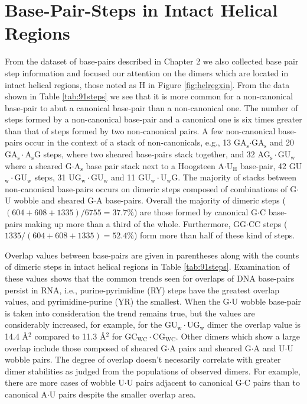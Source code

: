 \section{Base-Pair-Steps in Intact Helical Regions} 
From  the  dataset  of  base-pairs  described in  Chapter  2  we  also
collected base pair step information  and focused our attention on the
dimers which are  located in intact helical regions,  those noted as H
in  Figure   \ref{fig:helregxin}.   From  the  data   shown  in  Table
\ref{tab:91steps} we  see that it  is more common for  a non-canonical
base-pair to abut a canonical base-pair than a non-canonical one.  The
number of  steps formed by  a non-canonical base-pair and  a canonical
one  is  six   times  greater  than  that  of   steps  formed  by  two
non-canonical  pairs.  A few  non-canonical  base-pairs  occur in  the
context     of    a    stack     of    non-canonicals,     e.g.,    13
GA$_{\text{s}}$$\cdot$GA$_{\text{s}}$              and              20
GA$_{\text{s}}\cdot$A$_{\text{s}}$G    steps,   where    two   sheared
base-pairs stack  together, and 32 AG$_{\text{s}}\cdot$GU$_{\text{w}}$
where  a sheared  G$\cdot$A$_{\text{s}}$  base pair  stack  next to  a
Hoogsteen         A$\cdot$U$_{\text{H}}$         base-pair,         42
GU$_{\text{w}}\cdot$GU$_{\text{w}}$              steps,             31
UG$_{\text{w}}\cdot$GU$_{\text{w}}$               and               11
GU$_{\text{w}}\cdot$U$_{\text{w}}$G.   The majority of  stacks between
non-canonical   base-pairs  occurs  on   dimeric  steps   composed  of
combinations  of G$\cdot$U  wobble and  sheared  G$\cdot$A base-pairs.
Overall the majority of dimeric steps ($(604+608+1335)/6755 = 37.7\%$)
are those formed by canonical G$\cdot$C base-pairs making up more than
a    third   of   the    whole.    Furthermore,    GG$\cdot$CC   steps
($1335/(604+608+1335) = 52.4\%$) form more  than half of these kind of
steps.

Overlap values between base-pairs  are given in parentheses along with
the  counts  of dimeric  steps  in  intact  helical regions  in  Table
\ref{tab:91steps}. Examination  of these values shows  that the common
trends  seen for  overlaps of  DNA  base-pairs persist  in RNA,  i.e.,
purine-pyrimidine  (RY) steps  have the  greatest overlap  values, and
pyrimidine-purine  (YR)  the  smallest.   When  the  G$\cdot$U  wobble
base-pair is taken into consideration  the trend remains true, but the
values   are   considerably    increased,   for   example,   for   the
GU$_{\text{w}}\cdot$UG$_{\text{w}}$  dimer the  overlap value  is 14.4
\AA$^{\text{2}}$    compared     to    11.3    \AA$^{\text{2}}$    for
GC$_{\text{WC}}\cdot$CG$_{\text{WC}}$. Other dimers which show a large
overlap include those composed  of sheared G$\cdot$A pairs and sheared
G$\cdot$A and  U$\cdot$U wobble pairs.  The degree  of overlap doesn't
necesarily correlate with greater dimer stabilities as judged from the
populations of observed  dimers. For example, there are  more cases of
wobble U$\cdot$U  pairs adjacent to canonical G$\cdot$C  pairs than to
canonical A$\cdot$U pairs despite the smaller overlap area.

